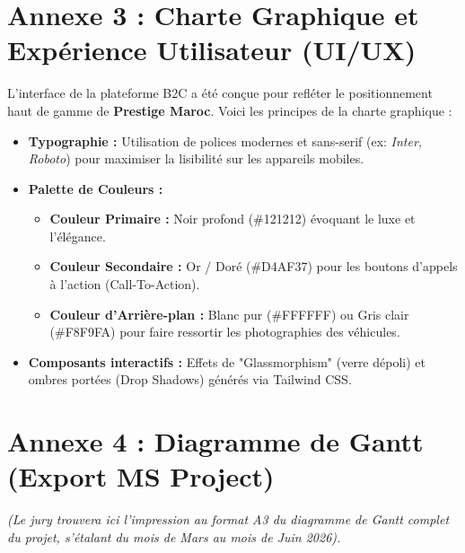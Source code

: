\section*{Annexe 3 : Charte Graphique et Expérience Utilisateur (UI/UX)}
L'interface de la plateforme B2C a été conçue pour refléter le positionnement haut de gamme de \textbf{Prestige Maroc}. Voici les principes de la charte graphique :
\begin{itemize}
    \item \textbf{Typographie :} Utilisation de polices modernes et sans-serif (ex: \textit{Inter, Roboto}) pour maximiser la lisibilité sur les appareils mobiles.
    \item \textbf{Palette de Couleurs :}
    \begin{itemize}
        \item \textbf{Couleur Primaire :} Noir profond (\#121212) évoquant le luxe et l'élégance.
        \item \textbf{Couleur Secondaire :} Or / Doré (\#D4AF37) pour les boutons d'appels à l'action (Call-To-Action).
        \item \textbf{Couleur d'Arrière-plan :} Blanc pur (\#FFFFFF) ou Gris clair (\#F8F9FA) pour faire ressortir les photographies des véhicules.
    \end{itemize}
    \item \textbf{Composants interactifs :} Effets de "Glassmorphism" (verre dépoli) et ombres portées (Drop Shadows) générés via Tailwind CSS.
\end{itemize}

\section*{Annexe 4 : Diagramme de Gantt (Export MS Project)}
\textit{(Le jury trouvera ici l'impression au format A3 du diagramme de Gantt complet du projet, s'étalant du mois de Mars au mois de Juin 2026).}

